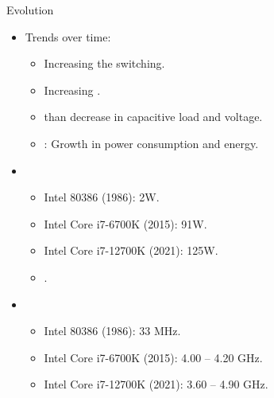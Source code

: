 \begin{frame}[t]{Evolution}
\begin{itemize}
  \item Trends over time:
    \begin{itemize}
      \item Increasing the  switching.
      \item Increasing .
      \item {} than decrease in capacitive load and voltage.
      \item {}: Growth in power consumption and energy.
    \end{itemize}

  \item {}
    \begin{itemize}
      \item Intel 80386 (1986): 2W.
      \item Intel Core i7-6700K (2015): 91W.
      \item Intel Core i7-12700K (2021): 125W.
      \item {}.
    \end{itemize}

  \item {}
    \begin{itemize}
      \item Intel 80386 (1986): 33 MHz.
      \item Intel Core i7-6700K (2015): 4.00 -- 4.20 GHz.
      \item Intel Core i7-12700K (2021): 3.60 -- 4.90 GHz.
    \end{itemize}
\end{itemize}
\end{frame}

